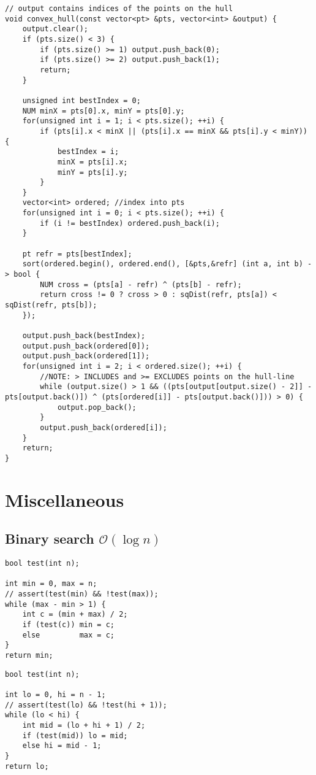 \documentclass{article}
\begin{document}
\begin{lstlisting}
// output contains indices of the points on the hull
void convex_hull(const vector<pt> &pts, vector<int> &output) {
	output.clear();
	if (pts.size() < 3) {
		if (pts.size() >= 1) output.push_back(0);
		if (pts.size() >= 2) output.push_back(1);
		return;
	}

	unsigned int bestIndex = 0;
	NUM minX = pts[0].x, minY = pts[0].y;
	for(unsigned int i = 1; i < pts.size(); ++i) {
		if (pts[i].x < minX || (pts[i].x == minX && pts[i].y < minY)) {
			bestIndex = i;
			minX = pts[i].x;
			minY = pts[i].y;
		}
	}
	vector<int> ordered; //index into pts
	for(unsigned int i = 0; i < pts.size(); ++i) {
		if (i != bestIndex) ordered.push_back(i);
	}

	pt refr = pts[bestIndex];
	sort(ordered.begin(), ordered.end(), [&pts,&refr] (int a, int b) -> bool {
		NUM cross = (pts[a] - refr) ^ (pts[b] - refr);
		return cross != 0 ? cross > 0 : sqDist(refr, pts[a]) < sqDist(refr, pts[b]);
	});
	
	output.push_back(bestIndex);
	output.push_back(ordered[0]);
	output.push_back(ordered[1]);
	for(unsigned int i = 2; i < ordered.size(); ++i) {
		//NOTE: > INCLUDES and >= EXCLUDES points on the hull-line
		while (output.size() > 1 && ((pts[output[output.size() - 2]] - pts[output.back()]) ^ (pts[ordered[i]] - pts[output.back()])) > 0) {
			output.pop_back();
		}
		output.push_back(ordered[i]);
	}
	return;
}

\end{lstlisting}

\section{Miscellaneous}
\subsection{Binary search $\mathcal{O}(\log n)$}

\noindent\begin{minipage}{.45\textwidth}
	\begin{lstlisting}[title={Inclusive, Exclusive}]
bool test(int n);
	
int min = 0, max = n;
// assert(test(min) && !test(max));
while (max - min > 1) {
	int c = (min + max) / 2;
	if (test(c)) min = c;
	else         max = c;
}
return min;
	\end{lstlisting}
\end{minipage}\hfill
\begin{minipage}{.45\textwidth}
	\begin{lstlisting}[title={Inclusive, Inclusive}]
bool test(int n);
	
int lo = 0, hi = n - 1;
// assert(test(lo) && !test(hi + 1));
while (lo < hi) {
	int mid = (lo + hi + 1) / 2;
	if (test(mid)) lo = mid;
	else hi = mid - 1;
}
return lo;
	\end{lstlisting}
\end{minipage}
\end{document}
